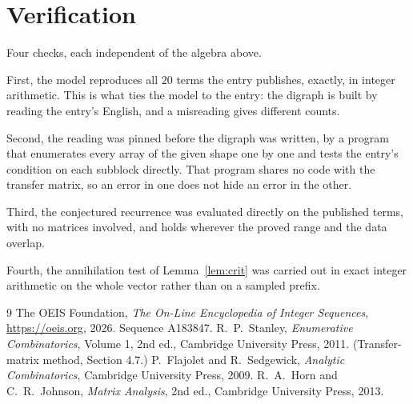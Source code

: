 \documentclass[11pt,a4paper]{article}
\theoremstyle{plain}
\theoremstyle{definition}
\begin{document}
\section{Verification}

Four checks, each independent of the algebra above.

First, the model reproduces all $20$ terms the entry publishes, exactly, in integer
arithmetic. This is what ties the model to the entry: the digraph is built by reading the
entry's English, and a misreading gives different counts.

Second, the reading was pinned before the digraph was written, by a program that enumerates
every array of the given shape one by one and tests the entry's condition on each subblock
directly. That program shares no code with the transfer matrix, so an error in one does not
hide an error in the other.

Third, the conjectured recurrence was evaluated directly on the published terms, with no
matrices involved, and holds wherever the proved range and the data overlap.

Fourth, the annihilation test of Lemma~\ref{lem:crit} was carried out in exact integer
arithmetic on the whole vector rather than on a sampled prefix.

\begin{thebibliography}{9}
 The OEIS Foundation, \emph{The On-Line Encyclopedia of Integer
Sequences}, \url{https://oeis.org}, 2026. Sequence A183847.
 R.~P.~Stanley, \emph{Enumerative Combinatorics}, Volume 1, 2nd ed.,
Cambridge University Press, 2011. (Transfer-matrix method, Section 4.7.)
 P.~Flajolet and R.~Sedgewick, \emph{Analytic Combinatorics}, Cambridge
University Press, 2009.
 R.~A.~Horn and C.~R.~Johnson, \emph{Matrix Analysis}, 2nd ed., Cambridge
University Press, 2013.
\end{thebibliography}
\end{document}
